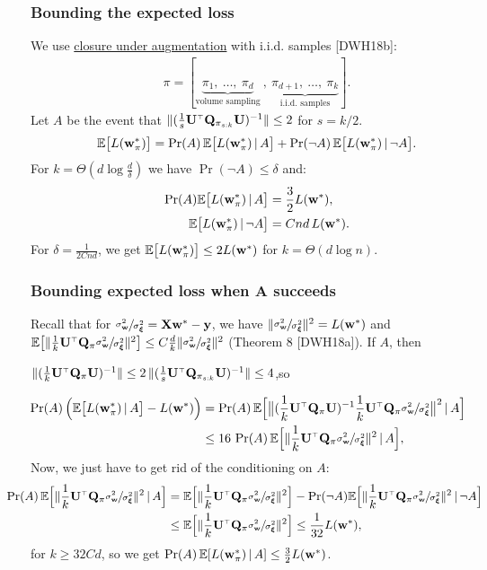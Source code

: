 \documentclass{beamer}
\begin{document}
\begin{frame}
  \frametitle{Bounding the expected loss}
We use \underline{closure under augmentation} with i.i.d. samples [DWH18b]:
\begin{align*}
  \pi = [\underbrace{\pi_1,\ \dots,\ \pi_d}_{\text{volume
  sampling}}\ ,\ \underbrace{\pi_{d+1},\ \dots,\ \pi_k}_{\text{i.i.d.~samples}}].
\end{align*}
Let $A$ be the event that
$\|(\frac1s\U^\top\Q_{\pi_{s:k}}\U)^{-1}\|\leq 2$ for $s=k/2$.
\begin{align*}
\mathbb E\big[L(\mathbf w_\pi^*)\big] = \mathrm{Pr}(A)\,\mathbb E\big[L(\mathbf w_\pi^*)\,|\,A\big] +
\mathrm{Pr}(\neg A)\,\mathbb E\big[L(\mathbf w_\pi^*)\,|\,\neg A\big].
\end{align*}
For $k=\Theta(d\log \frac{d}{\delta})$ we have $\Pr(\neg A)\leq
\delta$ and:  
\begin{align*}
 \mathrm{Pr}(A)\mathbb E\big[L(\mathbf w_\pi^*)\,|\,A\big]&= \frac32 L(\mathbf w^*),\\
  \mathbb E\big[L(\mathbf w_\pi^*)\,|\,\neg A\big]& = Cnd\, L(\mathbf w^*).
\end{align*}
For $\delta=\frac1{2Cnd}$, we get
$\mathbb E\big[L(\mathbf w_\pi^*)\big] \leq 2 L(\mathbf w^*)$ for $k=\Theta(d\log n)$.
\end{frame}

\begin{frame}
  \frametitle{Bounding expected loss when A succeeds}
Recall that for $\sfrac{\sigma_{\mathbf w}^2}{\sigma_{\boldsymbol\xi}^2}=\mathbf X\mathbf w^*-\mathbf y$, we have $\|\sfrac{\sigma_{\mathbf w}^2}{\sigma_{\boldsymbol\xi}^2}\|^2=L(\mathbf w^*)$ and
$\E\big[\|\frac1k\U^\top\Q_\pi\r\|^2\big] \leq C\frac{d}{k}\|\r\|^2$
(Theorem 8 [DWH18a]). If $A$, then
\begin{center} $\|(\frac1k\U^\top\Q_\pi\U)^{-1}\|\leq
  2\,\|(\frac1s\U^\top\Q_{\pi_{s:k}}\U)^{-1}\|\leq 4$,\quad so\end{center} 
  \begin{align*}
    \hspace{-5mm}
    \Pr(A)\,\Big(\E\big[L(\w_\pi^*)\,|\,A\big] - L(\w^*)\Big)
    &=
      \Pr(A)\,
      \E\Big[\big\|(\frac1k\U^\top\Q_\pi\U)^{-1}
      \frac1k\U^\top\Q_\pi\r\big\|^2\,|\,A\Big]
    \\
    &\leq 16\ \Pr(A)\,\E\Big[\|\frac1k\U^\top\Q_\pi\r\|^2\,|\,A\Big],
  \end{align*}
Now, we just have to get rid of the conditioning on $A$:
  \begin{align*}
    \hspace{-0.7cm}\Pr(A)\, \E\Big[\|\frac1k\U^\top\Q_\pi\r\|^2\,|\,A\Big]
    &=
    \E\Big[\|\frac1k\U^\top\Q_\pi\r\|^2\Big] - \Pr(\neg A)
    \E\Big[\|\frac1k\U^\top\Q_\pi\r\|^2\,|\,\neg A\Big]\\
    &\leq \E\Big[\|\frac1k\U^\top\Q_\pi\r\|^2\Big] \leq  \frac1{32}L(\w^*),
  \end{align*}
  for $k\geq 32Cd$, so we get $\mathrm{Pr}(A)\,\mathbb E[L(\mathbf w_\pi^*)\,|\,A]\leq
  \frac32 L(\mathbf w^*)$.
\end{frame}
\end{document}
